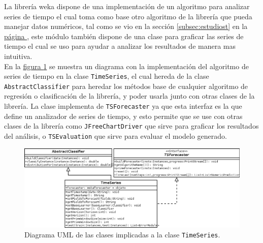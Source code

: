 La librería weka dispone de una implementación de un algoritmo para analizar series de tiempo el cual toma como base otro algoritmo de la librería que pueda manejar datos numéricos, tal como se vio en la sección \ref{subsec:estudiost} en la \hyperref[subsec:estudiost]{página \pageref{subsec:estudiost}}, este módulo también dispone de una clase para graficar las series de tiempo el cual se uso para ayudar a analizar los resultados de manera mas intuitiva.\\
En la \hyperref[fig:diagramaUml]{figura \ref{fig:diagramaUml}} 
se muestra un diagrama con la implementación del algoritmo de series de tiempo en la clase \texttt{TimeSeries}, el cual hereda de la clase \texttt{AbstractClassifier} para heredar los métodos base de cualquier algoritmo de regresión o clasificación de la librería, y poder usarla junto con otras clases de la librería. La clase implementa de \texttt{TSForecaster} ya que esta interfaz es la que define un analizador de series de tiempo, y esto permite que se use con otras clases de la librería como \texttt{JFreeChartDriver} que sirve para graficar los resultados del análisis, o \texttt{TSEvaluation} que sirve para evaluar el modelo generado.
\begin{figure}[!b]%
	\centering
	\includegraphics[width=15cm]{img/diagramaUml.png}
	\caption{Diagrama UML de las clases implicadas a la clase \texttt{TimeSeries}. }
	\label{fig:diagramaUml}
\end{figure}

